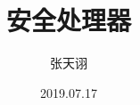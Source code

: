 \documentclass[UTF8]{ctexart}
\title{安全处理器}
\author{张天诩}
\date{2019.07.17}
\begin{document}

\nocite{costan2017secure1}
\nocite{costan2017secure2}
\begin{comment}
这里面是注释
\end{comment}

\maketitle

%
%
%
%
%

%
%
%
%


\end{document}
